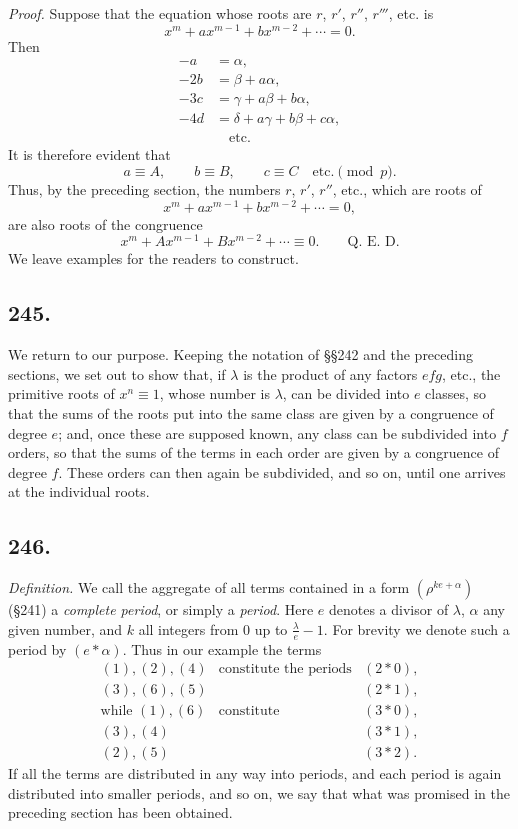 \documentclass[12pt]{article}
\begin{document}
\textit{Proof.} Suppose that the equation whose roots are $r$, $r'$, $r''$, $r'''$, etc. is
\[
x^m+a x^{m-1}+b x^{m-2}+\cdots=0.
\]
Then
\[
\begin{aligned}
-a&=\alpha,\\
-2b&=\beta+a\alpha,\\
-3c&=\gamma+a\beta+b\alpha,\\
-4d&=\delta+a\gamma+b\beta+c\alpha,\\
&\quad\text{etc.}
\end{aligned}
\]
It is therefore evident that
\[
a\equiv A,
\qquad b\equiv B,
\qquad c\equiv C\quad \text{etc.}\pmod p.
\]
Thus, by the preceding section, the numbers $r$, $r'$, $r''$, etc., which are roots of
\[
x^m+a x^{m-1}+b x^{m-2}+\cdots=0,
\]
are also roots of the congruence
\[
x^m+A x^{m-1}+B x^{m-2}+\cdots\equiv 0. \qquad \text{Q. E. D.}
\]
We leave examples for the readers to construct.

\subsection*{245.}
We return to our purpose. Keeping the notation of §§242 and the preceding sections, we set out to show that, if $\lambda$ is the product of any factors $efg$, etc., the primitive roots of $x^n\equiv 1$, whose number is $\lambda$, can be divided into $e$ classes, so that the sums of the roots put into the same class are given by a congruence of degree $e$; and, once these are supposed known, any class can be subdivided into $f$ orders, so that the sums of the terms in each order are given by a congruence of degree $f$. These orders can then again be subdivided, and so on, until one arrives at the individual roots.

\subsection*{246.}
\textit{Definition.} We call the aggregate of all terms contained in a form $(\rho^{ke+\alpha})$ (§241) a \textit{complete period}, or simply a \textit{period}. Here $e$ denotes a divisor of $\lambda$, $\alpha$ any given number, and $k$ all integers from $0$ up to $\frac{\lambda}{e}-1$. For brevity we denote such a period by $(e*\alpha)$. Thus in our example the terms
\[
\begin{array}{rcl}
(1),(2),(4)&\text{constitute the periods}&(2*0),\\
(3),(6),(5)&& (2*1),\\[2pt]
\text{while }(1),(6)&\text{constitute}&(3*0),\\
(3),(4)&& (3*1),\\
(2),(5)&& (3*2).
\end{array}
\]
If all the terms are distributed in any way into periods, and each period is again distributed into smaller periods, and so on, we say that what was promised in the preceding section has been obtained.
\end{document}
